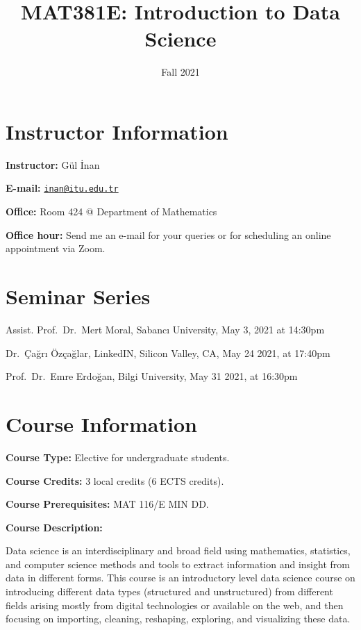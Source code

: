 \documentclass[
  12pt,
]{article}
\title{MAT381E: Introduction to Data Science}
\author{}
\date{\vspace{-2.5em}Fall 2021}
\begin{document}
\maketitle

\hypertarget{instructor-information}{%
\section{Instructor Information}\label{instructor-information}}

\textbf{Instructor:} Gül İnan

\textbf{E-mail:}
\href{mailto:inan@itu.edu.tr}{\nolinkurl{inan@itu.edu.tr}}

\textbf{Office:} Room 424 @ Department of Mathematics

\textbf{Office hour:} Send me an e-mail for your queries or for
scheduling an online appointment via Zoom.

\hypertarget{seminar-series}{%
\section{Seminar Series}\label{seminar-series}}

Assist. Prof.~Dr.~Mert Moral, Sabancı University, May 3, 2021 at 14:30pm

Dr.~Çağrı Özçağlar, LinkedIN, Silicon Valley, CA, May 24 2021, at
17:40pm

Prof.~Dr.~Emre Erdoğan, Bilgi University, May 31 2021, at 16:30pm

\hypertarget{course-information}{%
\section{Course Information}\label{course-information}}

\textbf{Course Type:} Elective for undergraduate students.

\textbf{Course Credits:} 3 local credits (6 ECTS credits).

\textbf{Course Prerequisites:} MAT 116/E MIN DD.

\textbf{Course Description:}

Data science is an interdisciplinary and broad field using mathematics,
statistics, and computer science methods and tools to extract
information and insight from data in different forms. This course is an
introductory level data science course on introducing different data
types (structured and unstructured) from different fields arising mostly
from digital technologies or available on the web, and then focusing on
importing, cleaning, reshaping, exploring, and visualizing these data.
\end{document}
